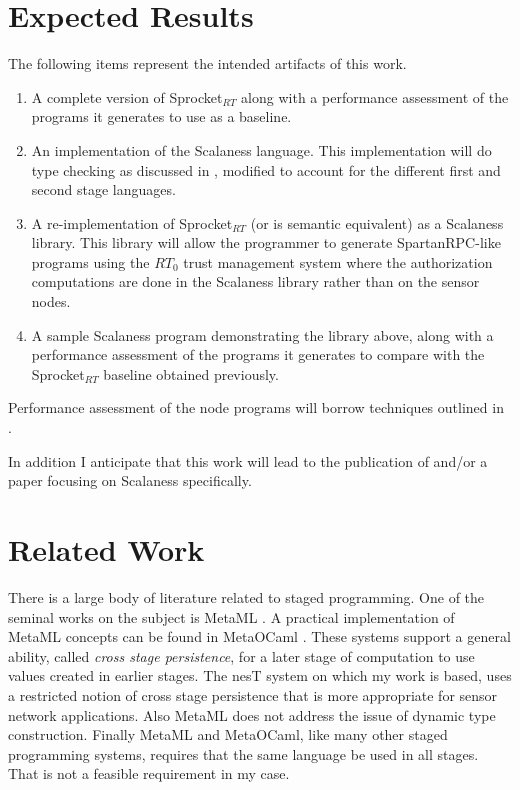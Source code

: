 \documentclass{article}
\begin{document}
\section{Expected Results}
\label{sec:expected-results}

The following items represent the intended artifacts of this work.

\begin{enumerate}
\item A complete version of Sprocket$_{RT}$ along with a performance assessment of the programs
  it generates to use as a baseline.
\item An implementation of the Scalaness language. This implementation will do type checking as
  discussed in \cite{nesT}, modified to account for the different first and second stage
  languages.
\item A re-implementation of Sprocket$_{RT}$ (or is semantic equivalent) as a Scalaness library.
  This library will allow the programmer to generate SpartanRPC-like programs using the $RT_0$
  trust management system where the authorization computations are done in the Scalaness library
  rather than on the sensor nodes.
\item A sample Scalaness program demonstrating the library above, along with a performance
  assessment of the programs it generates to compare with the Sprocket$_{RT}$ baseline obtained
  previously.
\end{enumerate}

Performance assessment of the node programs will borrow techniques outlined in
\cite{Malan:2008:IPI:1387663.1387668}.

In addition I anticipate that this work will lead to the publication of \cite{nesT} and/or a
paper focusing on Scalaness specifically.

\section{Related Work}
\label{sec:RelatedWork}


There is a large body of literature related to staged programming. One of the seminal works on
the subject is MetaML \cite{Taha-MetaML}. A practical implementation of MetaML concepts can be
found in MetaOCaml \cite{Calcagno-MetaOCaml}. These systems support a general ability, called
\emph{cross stage persistence}, for a later stage of computation to use values created in
earlier stages. The nesT system on which my work is based, uses a restricted notion of cross
stage persistence that is more appropriate for sensor network applications. Also MetaML does not
address the issue of dynamic type construction. Finally MetaML and MetaOCaml, like many other
staged programming systems, requires that the same language be used in all stages. That is not a
feasible requirement in my case.
\end{document}
